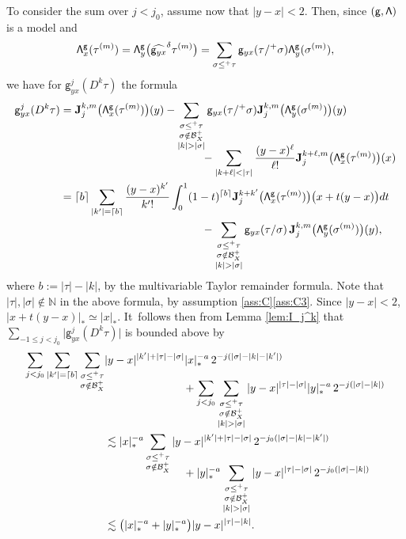 \documentclass[10pt]{amsart}
\theoremstyle{plain}
\theoremstyle{definition}
\newcommand{\bfJ}{\mathbf{J}}
\newcommand{\sfg}{\mathsf{g}}
\newcommand{\bbN}{\mathbb{N}}
\newcommand{\mcB}{\mathcal{B}}
\begin{document}
To consider the sum over $j<j_0$, assume now that $|y-x|<2$. Then, since $\sf (g, \Lambda)$ is a model and
\begin{align*}
{\sf\Lambda}^{\sfg}_x(\tau^{(m)}) = {\sf\Lambda}^{\sfg}_y\bigl(\widehat{{\sf g}_{yx}}^{\delta}\tau^{(m)}\bigr) = \sum_{\sigma\le^+\tau}\sfg_{yx}(\tau/^+\sigma){\sf\Lambda}^{\sfg}_y(\sigma^{(m)}),
\end{align*}
we have for $\sfg_{yx}^j(D^k\tau)$ the formula
\begin{align*}
\sfg_{yx}^j(D^k\tau)
&=\bfJ_j^{k,m}\bigl({\sf\Lambda}^{\sfg}_x(\tau^{(m)})\bigr)(y) - \sum_{\substack{\sigma\le^+\tau\\ \sigma\notin\mcB_X^+\\|k|>|\sigma|}} \sfg_{yx}(\tau/^+\sigma)\bfJ_j^{k,m}\bigl({\sf\Lambda}^{\sfg}_y(\sigma^{(m)})\bigr)(y) \\[-10pt]
&\hspace*{4.5cm}- \sum_{|k+\ell|<|\tau|}\frac{(y-x)^\ell}{\ell!}\bfJ_j^{k+\ell, m}\bigl({\sf\Lambda}^{\sfg}_x(\tau^{(m)})\bigr)(x) \\
&= \lceil b\rceil\sum_{|k'|=\lceil b \rceil}\frac{(y-x)^{k'}}{{k'}!}\int_0^1(1-t)^{\lceil b\rceil}\bfJ_j^{k+{k'}}\bigl({\sf\Lambda}^{\sfg}_x(\tau^{(m)})\bigr)\bigl(x+t(y-x)\bigr)dt \\
&\hspace*{4.5cm}- \sum_{\substack{\sigma\le^+\tau\\\sigma\notin\mcB_X^+\\|k|>|\sigma|}}\sfg_{yx}(\tau/\sigma)\,\bfJ_j^{k,m}\bigl({\sf\Lambda}^\sfg_y(\sigma^{(m)})\bigr)(y),
\end{align*}
where $b\!:=\!|\tau|-|k|$, by the multivariable Taylor remainder formula. Note that $|\tau|,|\sigma|\!\notin\!\bbN$ in the above formula, by assumption \ref{ass:C}\eqref{ass:C3}. Since $|y-x|<2$, $|x+t(y-x)|_*\simeq|x|_*$. It~follows then from Lemma \ref{lem:I_j^k} that $\sum_{-1\leq j<j_0}\big|\sfg_{yx}^j(D^k\tau)\big|$ is bounded above by\vspace*{-3pt}
\begin{align*}
\sum_{j<j_0}\sum_{|{k'}|=\lceil b\rceil}\sum_{\substack{\sigma\leq^+\tau\\\sigma\notin\mcB_X^+}}& |y-x|^{|{k'}|+|\tau|-|\sigma|}|x|_*^{-a}\,2^{-j(|\sigma|-|k|-|{k'}|)} \\[-15pt]
&\hspace*{2.5cm}+ \sum_{j<j_0}\sum_{\substack{\sigma\le^+\tau\\\sigma\notin\mcB_X^+\\|k|>|\sigma|}} |y-x|^{|\tau|-|\sigma|}|y|_*^{-a}\,2^{-j(|\sigma|-|k|)} \\
&\lesssim |x|_*^{-a}\sum_{\substack{\sigma\leq^+\tau\\\sigma\notin\mcB_X^+}} |y-x|^{|{k'}|+|\tau|-|\sigma|}\,2^{-j_0(|\sigma|-|k|-|{k'}|)} \\[-12pt]
&\hspace*{2.5cm}+ |y|_*^{-a}\sum_{\substack{\sigma\le^+\tau\\\sigma\notin\mcB_X^+\\|k|>|\sigma|}}|y-x|^{|\tau|-|\sigma|}\,2^{-j_0(|\sigma|-|k|)} \\
&\lesssim\bigl(|x|_*^{-a}+|y|_*^{-a}\bigr)|y-x|^{|\tau|-|k|}.
\end{align*}
\end{document}
